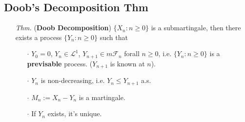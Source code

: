 \documentclass[a4paper,12pt,twoside]{book}
\begin{document}
\subsection{Doob's Decomposition Thm}
\begin{itemize}
	\item[\textit{Thm.}] (\textbf{Doob Decomposition}) $\{X_n: n\geq 0\}$ is a submartingale, then there exists a process $\{Y_n: n\geq 0\}$ such that 
	\begin{itemize}
		\item[$\cdot$] $Y_0=0$, $Y_n \in \mathcal{L}^1$, $Y_{n+1} \in m \mathcal{F}_n$ forall $n\geq0$, i.e. $\{Y_n: n\geq 0\}$ is a \textbf{previsable} process. ($Y_{n+1}$ is known at $n$).
		\item[$\cdot$] $Y_n$ is non-decreasing, i.e. $Y_n\leq Y_{n+1}$ a.s.
		\item[$\cdot$] $M_n:=X_n-Y_n$ is a martingale.
		\item[$\cdot$] If $Y_n$ exists, it's unique.
	\end{itemize}


\end{itemize}
\end{document}
